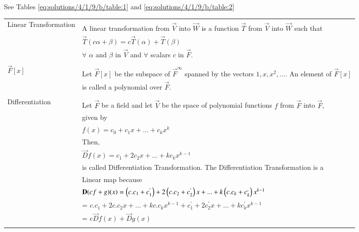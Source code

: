 See Tables \ref{eq:solutions/4/1/9/b/table:1} and \ref{eq:solutions/4/1/9/b/table:2}
%
\begin{table*}[!ht]
	\begin{tabular}{|l|l|}
	\hline
	\multirow{3}{*}{Linear Transformation} & \\
	& A linear transformation from $\vec{V}$ into $\vec{W}$ is a function $\vec{T}$ from $\vec{V}$ into $\vec{W}$ such that \\
	& \qquad \qquad \qquad \qquad \qquad $\vec{T}(c\alpha + \beta) = c\vec{T}(\alpha) + \vec{T}(\beta)$  \\
	& $\forall$ $\alpha$ and $\beta$ in $\vec{V}$ and $\forall$ scalars $c$ in $\vec{F}$. \\
	& \\
	\hline
	\multirow{3}{*}{\qquad \qquad $\vec{F}[x]$} & \\
	& Let $\vec{F}[x]$ be the subspace of $\vec{F}^{\infty}$ spanned by the vectors $1, x, x^2,...$. An element of $\vec{F}[x]$ \\
	& is called a polynomial over $\vec{F}$. \\
	& \\
	\hline
	\multirow{3}{*}{\qquad Differentiation} & \\
	& Let $\vec{F}$ be a field and let $\vec{V}$ be the space of polynomial functions $f$ from $\vec{F}$ into $\vec{F}$,\\
\qquad Transformation & given by \\
    & \qquad \qquad \qquad  $f(x) = c_0 + c_1x + . . . + c_kx^k$\\  
    & Then,\\
    &\qquad \qquad \qquad $\vec{D}f(x) = c_1 + 2c_2x + ...+ kc_kx^{k-1} $\\
    & is called Differentiation Transformation. The Differentiation Transformation is a \\
	& Linear map because \\
	& \qquad \qquad \qquad $\mathbf{D}(cf+g)(x) = \left(c.c_1 + c_1^{'}\right) + 2\left(c.c_2 + c_2^{'}\right)x + ... + k\left(c.c_k + c_k^{,}\right)x^{k-1}$ \\
    & \qquad \qquad \qquad \qquad \qquad \qquad = $c.c_1 + 2c.c_2x + ... + kc.c_kx^{k-1} + c_1^{'} + 2c_2^{'}x + ... + kc_k^{'}x^{k-1}$ \\	
    & \qquad \qquad \qquad \qquad \qquad \qquad = c$\vec{D}f(x) + \vec{D}g(x)$ \label{eq:solutions/4/1/9/b/2}\\
    &\\
    \hline
\end{tabular}
\caption{}
\label{eq:solutions/4/1/9/b/table:1}
\end{table*}
